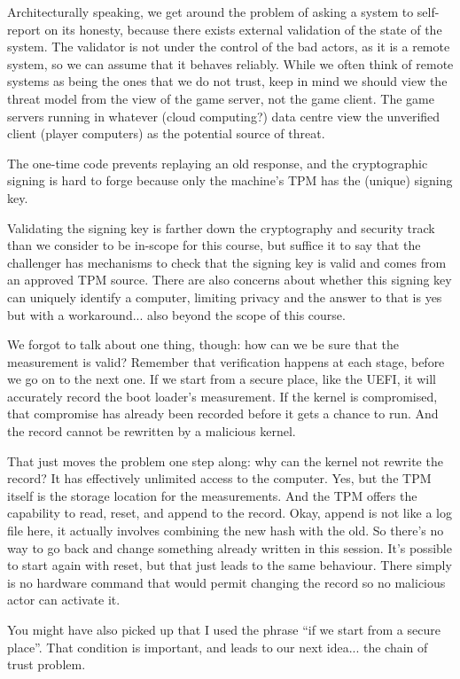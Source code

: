 Architecturally speaking, we get around the problem of asking a system to self-report on its honesty, because there exists external validation of the state of the system. The validator is not under the control of the bad actors, as it is a remote system, so we can assume that it behaves reliably. While we often think of remote systems as being the ones that we do not trust, keep in mind we should view the threat model from the view of the game server, not the game client. The game servers running in whatever (cloud computing?) data centre view the unverified client (player computers) as the potential source of threat.

The one-time code prevents replaying an old response, and the cryptographic signing is hard to forge because only the machine's TPM has the (unique) signing key.

Validating the signing key is farther down the cryptography and security track than we consider to be in-scope for this course, but suffice it to say that the challenger has mechanisms to check that the signing key is valid and comes from an approved TPM source. There are also concerns about whether this signing key can uniquely identify a computer, limiting privacy and the answer to that is yes but with a workaround... also beyond the scope of this course.

We forgot to talk about one thing, though: how can we be sure that the measurement is valid? Remember that verification happens at each stage, before we go on to the next one. If we start from a secure place, like the UEFI, it will accurately record the boot loader's measurement. If the kernel is compromised, that compromise has already been recorded before it gets a chance to run. And the record cannot be rewritten by a malicious kernel.

That just moves the problem one step along: why can the kernel not rewrite the record? It has effectively unlimited access to the computer. Yes, but the TPM itself is the storage location for the measurements. And the TPM offers the capability to read, reset, and append to the record. Okay, append is not like a log file here, it actually involves combining the new hash with the old. So there's no way to go back and change something already written in this session. It's possible to start again with reset, but that just leads to the same behaviour. There simply is no hardware command that would permit changing the record so no malicious actor can activate it.

You might have also picked up that I used the phrase ``if we start from a secure place''. That condition is important, and leads to our next idea... the chain of trust problem.

